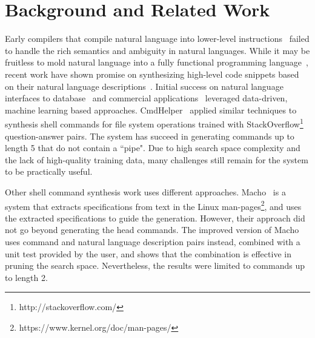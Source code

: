 \section{Background and Related Work}
Early compilers that compile natural language into lower-level instructions~\cite{sammet1966use,Ballard:1979:PNL:800177.810072}
failed to handle the rich semantics and ambiguity in natural languages. 
While it may be fruitless to mold natural language into a fully functional programming language~\cite{Dijkstra:1978:FNL:647639.760596}, recent work have shown promise on synthesizing high-level code snippets based on their natural language descriptions~\cite{gulwani2010dimensions,DBLP:journals/corr/DesaiGHJKMRR15}.  
Initial success on natural language interfaces to database~\cite{Popescu:2003:TTN:604045.604070,DBLP:journals/pvldb/LiJ14} and commercial applications~\cite{DBLP:conf/mobisys/LeGS13,DBLP:conf/acl/QuirkMG15} leveraged data-driven, machine learning based approaches. CmdHelper~\cite{bashsynthesis} applied similar techniques to synthesis shell commands for file system operations trained with StackOverflow\footnote{http://stackoverflow.com/} question-answer pairs. The system has succeed in generating commands up to length 5 that do not contain a ``pipe". Due to high search space complexity and the lack of high-quality training data, many challenges still remain for the system to be practically useful.



Other shell command synthesis work uses different approaches.
Macho~\cite{cozzie2011macho} is a system that extracts specifications from text in the Linux man-pages\footnote{https://www.kernel.org/doc/man-pages/}, and uses the extracted specifications to guide the generation. However, their approach did not go beyond generating the head commands. The improved version of Macho~\cite{cozzie2012macho} uses command and natural language description pairs instead, combined with a unit test provided by the user, and shows that the combination is effective in pruning the search space. Nevertheless, the results were limited to commands up to length 2.

